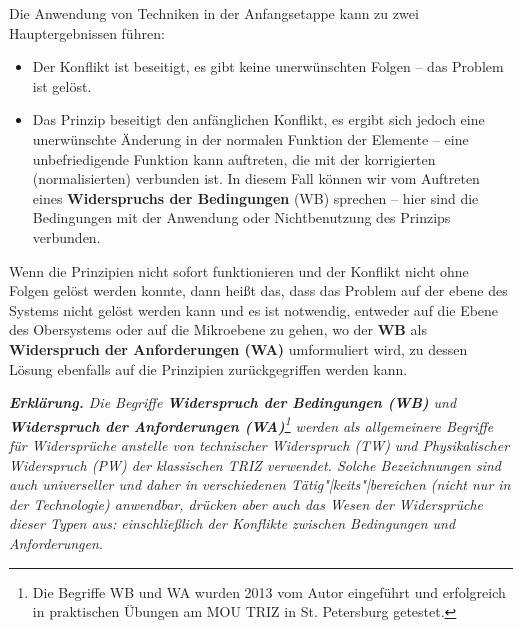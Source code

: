 \documentclass[11pt,a4paper]{article}
\begin{document}
Die Anwendung von Techniken in der Anfangsetappe kann zu zwei Hauptergebnissen
führen:
\begin{itemize}
\item[1.] Der Konflikt ist beseitigt, es gibt keine unerwünschten Folgen --
  das Problem ist gelöst. 
\item[2.] Das Prinzip beseitigt den anfänglichen Konflikt, es ergibt sich
  jedoch eine unerwünschte Änderung in der normalen Funktion der Elemente --
  eine unbefriedigende Funktion kann auftreten, die mit der korrigierten
  (normalisierten) verbunden ist. In diesem Fall können wir vom Auftreten
  eines \textbf{Widerspruchs der Bedingungen} (WB) sprechen -- hier sind die
  Bedingungen mit der Anwendung oder Nichtbenutzung des Prinzips verbunden.
\end{itemize}
Wenn die Prinzipien nicht sofort funktionieren und der Konflikt nicht ohne
Folgen gelöst werden konnte, dann heißt das, dass das Problem auf der ebene
des Systems nicht gelöst werden kann und es ist notwendig, entweder auf die
Ebene des Obersystems oder auf die Mikroebene zu gehen, wo der \textbf{WB} als
\textbf{Widerspruch der Anforderungen (WA)} umformuliert wird, zu dessen
Lösung ebenfalls auf die Prinzipien zurückgegriffen werden kann.

\emph{\textbf{Erklärung.} Die Begriffe \textbf{Widerspruch der Bedingungen
    (WB)} und \textbf{Widerspruch der Anforderungen (WA)}\footnote{Die
    Begriffe WB und WA wurden 2013 vom Autor eingeführt und erfolgreich in
    praktischen Übungen am MOU TRIZ in St. Petersburg getestet.}  werden als
  allgemeinere Begriffe für Widersprüche anstelle von technischer Widerspruch
  (TW) und Physikalischer Widerspruch (PW) der klassischen TRIZ verwendet.
  Solche Bezeichnungen sind auch universeller und daher in verschiedenen
  Tätig"|keits"|bereichen (nicht nur in der Technologie) anwendbar, drücken
  aber auch das Wesen der Widersprüche dieser Typen aus: einschließlich der
  Konflikte zwischen Bedingungen und Anforderungen.}
\end{document}
